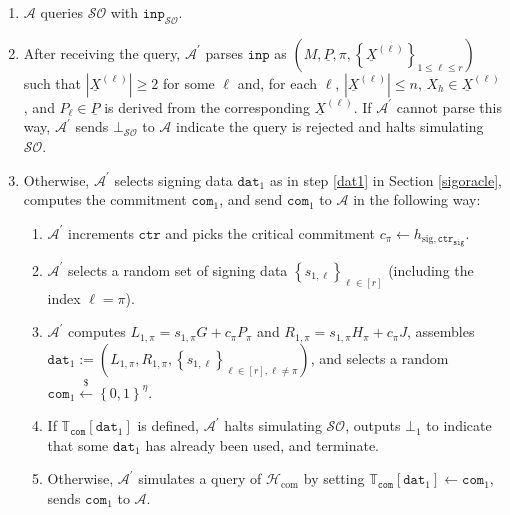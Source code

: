 \documentclass{iacrtrans}
\theoremstyle{definition}
\numberwithin{theorem}{subsection}
\numberwithin{lemma}{theorem}
\newcommand{\adversary}{\mathcal{A}}
\begin{document}
\begin{description}
\begin{description}
\begin{enumerate}
\item $\adversary$ queries $\mathcal{SO}$ with $\texttt{inp}_{\mathcal{SO}}$.

\item After receiving the query, $\adversary^\prime$ parses $\texttt{inp}$ as $\left(M, \underline{P}, \pi, \left\{\underline{X}^{(\ell)}\right\}_{1 \leq \ell \leq r}\right)$ such that $\left|\underline{X}^{(\ell)}\right| \geq 2$ for some $\ell$ and, for each $\ell$, $\left|\underline{X}^{(\ell)}\right| \leq n$, $X_h \in \underline{X}^{(\ell)}$, and $P_\ell \in \underline{P}$ is derived from the corresponding $\underline{X}^{(\ell)}$. If $\adversary^\prime$ cannot parse this way, $\adversary^\prime$ sends $\bot_{\mathcal{SO}}$ to $\adversary$ indicate the query is rejected and halts simulating $\mathcal{SO}$.

\item Otherwise, $\adversary^\prime$ selects signing data $\texttt{dat}_1$ as in step \ref{dat1} in Section \ref{sigoracle}, computes the commitment $\texttt{com}_1$, and send $\texttt{com}_1$ to $\adversary$ in the following way: 
\begin{enumerate}
\item $\adversary^\prime$ increments $\texttt{ctr}$ and picks the critical commitment $c_\pi \leftarrow h_{\text{sig},\texttt{ctr}_{\texttt{sig}}}$. 

\item $\adversary^\prime$ selects a random set of signing data $\left\{s_{1,\ell}\right\}_{\ell \in [r]}$ (including the index $\ell = \pi$). 

\item $\adversary^\prime$ computes $L_{1, \pi} = s_{1,\pi} G + c_{\pi} P_\pi$ and $R_{1, \pi} = s_{1,\pi} H_\pi + c_\pi J$, assembles $\texttt{dat}_1 := (L_{1,\pi}, R_{1,\pi}, \left\{s_{1,\ell}\right\}_{\ell \in [r], \ell \neq \pi})$, and selects a random $\texttt{com}_1 \overset{\$}{\leftarrow} \left\{0,1\right\}^\eta$. 

\item If $\mathbb{T}_{\texttt{com}}[\texttt{dat}_1]$ is defined, $\adversary^\prime$ halts simulating $\mathcal{SO}$, outputs $\bot_1$ to indicate that some $\texttt{dat}_1$ has already been used, and terminate. 

\item Otherwise, $\adversary^\prime$ simulates a query of $\mathcal{H}_{\text{com}}$ by setting $\mathbb{T}_{\texttt{com}}\left[\texttt{dat}_1\right] \leftarrow \texttt{com}_1$, sends $\texttt{com}_1$ to $\adversary$. 


\end{enumerate}
\end{enumerate}
\end{description}
\end{description}
\end{document}
